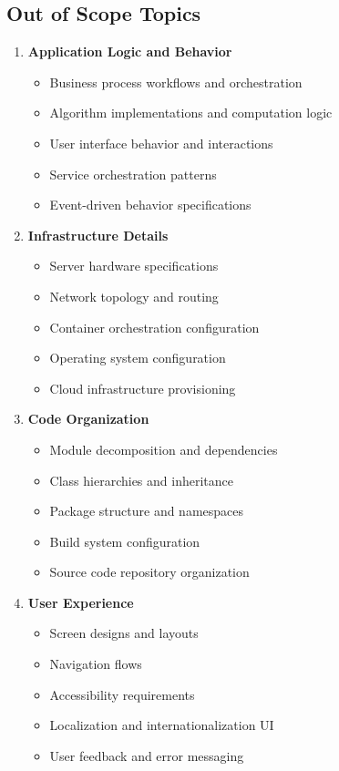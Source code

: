 \documentclass[11pt,letterpaper]{article}
\begin{document}
\subsection{Out of Scope Topics}

\begin{enumerate}[label=\textbf{AC\arabic*:}, leftmargin=2.5em]
    \item \textbf{Application Logic and Behavior}
    \begin{itemize}[nosep]
        \item Business process workflows and orchestration
        \item Algorithm implementations and computation logic
        \item User interface behavior and interactions
        \item Service orchestration patterns
        \item Event-driven behavior specifications
    \end{itemize}
    
    \item \textbf{Infrastructure Details}
    \begin{itemize}[nosep]
        \item Server hardware specifications
        \item Network topology and routing
        \item Container orchestration configuration
        \item Operating system configuration
        \item Cloud infrastructure provisioning
    \end{itemize}
    
    \item \textbf{Code Organization}
    \begin{itemize}[nosep]
        \item Module decomposition and dependencies
        \item Class hierarchies and inheritance
        \item Package structure and namespaces
        \item Build system configuration
        \item Source code repository organization
    \end{itemize}
    
    \item \textbf{User Experience}
    \begin{itemize}[nosep]
        \item Screen designs and layouts
        \item Navigation flows
        \item Accessibility requirements
        \item Localization and internationalization UI
        \item User feedback and error messaging
    \end{itemize}
    

\end{enumerate}
\end{document}
